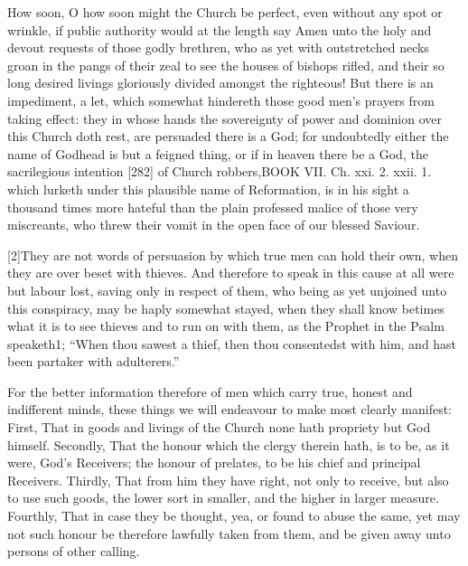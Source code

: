 How soon, O how soon might the Church be perfect, even without any spot or wrinkle, if public authority would at the length say Amen unto the holy and devout requests of those godly brethren, who as yet with outstretched necks groan in the pangs of their zeal to see the houses of bishops rifled, and their so long desired livings gloriously divided amongst the righteous! But there is an impediment, a let, which somewhat hindereth those good men’s prayers from taking effect: they in whose hands the sovereignty of power and dominion over this Church doth rest, are persuaded there is a God; for undoubtedly either the name of Godhead is but a feigned thing, or if in heaven there be a God, the sacrilegious intention [282] of Church robbers,BOOK VII. Ch. xxi. 2. xxii. 1. which lurketh under this plausible name of Reformation, is in his sight a thousand times more hateful than the plain professed malice of those very miscreants, who threw their vomit in the open face of our blessed Saviour.

[2]They are not words of persuasion by which true men can hold their own, when they are over beset with thieves. And therefore to speak in this cause at all were but labour lost, saving only in respect of them, who being as yet unjoined unto this conspiracy, may be haply somewhat stayed, when they shall know betimes what it is to see thieves and to run on with them, as the Prophet in the Psalm speaketh1; “When thou sawest a thief, then thou consentedst with him, and hast been partaker with adulterers.”

For the better information therefore of men which carry true, honest and indifferent minds, these things we will endeavour to make most clearly manifest: First, That in goods and livings of the Church none hath propriety but God himself. Secondly, That the honour which the clergy therein hath, is to be, as it were, God’s Receivers; the honour of prelates, to be his chief and principal Receivers. Thirdly, That from him they have right, not only to receive, but also to use such goods, the lower sort in smaller, and the higher in larger measure. Fourthly, That in case they be thought, yea, or found to abuse the same, yet may not such honour be therefore lawfully taken from them, and be given away unto persons of other calling.

